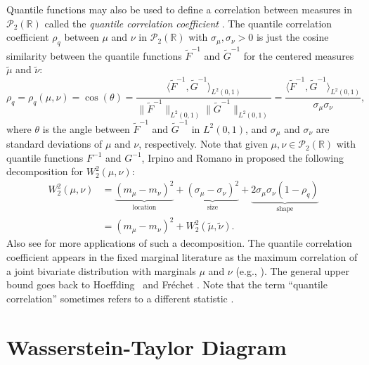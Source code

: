 \documentclass{amsart}
\numberwithin{equation}{section}
\theoremstyle{plain}
\theoremstyle{definition}
\newcommand\bR{{\mathbb R}}
\begin{document}
Quantile functions may also be used to define a correlation between measures in $\mathcal{P}_2(\bR)$ called the \emph{quantile correlation coefficient} \cite{irpino2015basic,irpino2015linear}.
The quantile correlation coefficient $\rho_q$ between $\mu$ and $\nu$ in $\mathcal{P}_2(\bR)$ with $\sigma_\mu, \sigma_\nu >0$ is just the cosine similarity between the quantile functions $\widetilde{F}^{-1}$ and $\widetilde{G}^{-1}$ for the centered measures $\widetilde{\mu}$ and $\widetilde{\nu}$: 
\begin{equation}\label{eqn:defncorrcoeff2}
\rho_q = \rho_q(\mu, \nu) = \cos (\theta) = \frac{\langle \widetilde{F}^{-1}, \widetilde{G}^{-1}\rangle_{L^2(0,1)}}{\| \widetilde{F}^{-1}\|_{L^2(0,1)} \| \widetilde{G}^{-1}\|_{L^2(0,1)}} = \frac{\langle \widetilde{F}^{-1}, \widetilde{G}^{-1}\rangle_{L^2(0,1)}}{\sigma_\mu \sigma_\nu},
\end{equation}
where $\theta$ is the angle between $\widetilde{F}^{-1}$ and $\widetilde{G}^{-1}$ in $L^2(0,1)$, and $\sigma_\mu$ and $\sigma_\nu$ are standard deviations of $\mu$ and $\nu$, respectively. 
Note that given $\mu, \nu \in \mathcal{P}_2(\mathbb{R})$ with quantile functions $ F^{-1}$ and $G^{-1}$, Irpino and Romano in \cite{irpino2007optimal}  proposed the following decomposition for $W_2^2(\mu,\nu)$:
\begin{align}
    W_2^2(\mu, \nu)  &= \underbrace{(m_\mu - m_\nu)^2}_{\textrm{location}} + \underbrace{(\sigma_\mu - \sigma_\nu)^2}_{\textrm{size}}+ \underbrace{2 \sigma_\mu \sigma_\nu (1-\rho_q)}_{\textrm{shape}} \nonumber\\ 
    &= (m_\mu - m_\nu)^2 + W_2^2(\tilde{\mu},\tilde{\nu}).\label{eq:W2Decomposition}
\end{align}
Also see \cite{irpino2015linear, schefzik2021fast} for more applications of such a decomposition. 
The quantile correlation coefficient appears in the fixed marginal literature as the maximum correlation of a joint bivariate distribution with marginals $\mu$ and $\nu$ (e.g., \cite{lin2014recent}). The general upper bound goes back to Hoeffding~\cite{hoeffding1940masstabinvariante} and Fr{\'e}chet \cite{frechet1951correlation}.
Note that the term ``quantile correlation'' sometimes refers to a different statistic \cite{choi2022quantile}.







\section{Wasserstein-Taylor Diagram}\label{sec:mainTheorem}
\end{document}
